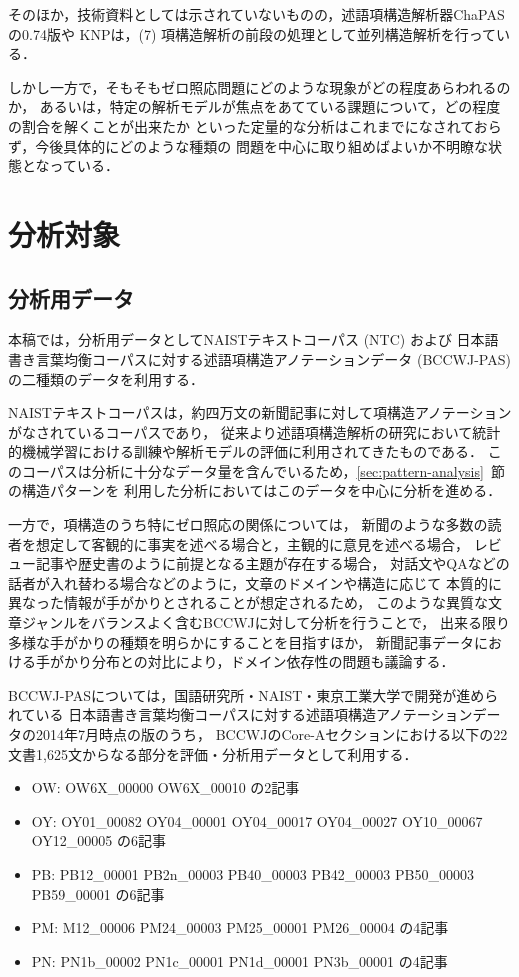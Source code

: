 \documentclass[japanese]{jnlp_1.4}
\begin{document}
そのほか，技術資料としては示されていないものの，述語項構造解析器ChaPASの0.74版\cite{chapas2013}や
KNP\cite{knp2013}は，(7) 項構造解析の前段の処理として並列構造解析を行っている．

しかし一方で，そもそもゼロ照応問題にどのような現象がどの程度あらわれるのか，
あるいは，特定の解析モデルが焦点をあてている課題について，どの程度の割合を解くことが出来たか
といった定量的な分析はこれまでになされておらず，今後具体的にどのような種類の
問題を中心に取り組めばよいか不明瞭な状態となっている．


\section{分析対象}

\subsection{分析用データ}

本稿では，分析用データとしてNAISTテキストコーパス (NTC) および
日本語書き言葉均衡コーパスに対する述語項構造アノテーションデータ (BCCWJ-PAS) の二種類のデータを利用する．

NAISTテキストコーパスは，約四万文の新聞記事に対して項構造アノテーションがなされているコーパスであり，
従来より述語項構造解析の研究において統計的機械学習における訓練や解析モデルの評価に利用されてきたものである．
このコーパスは分析に十分なデータ量を含んでいるため，\ref{sec:pattern-analysis}~節の構造パターンを
利用した分析においてはこのデータを中心に分析を進める．

一方で，項構造のうち特にゼロ照応の関係については，
新聞のような多数の読者を想定して客観的に事実を述べる場合と，主観的に意見を述べる場合，
レビュー記事や歴史書のように前提となる主題が存在する場合，
対話文やQAなどの話者が入れ替わる場合などのように，文章のドメインや構造に応じて
本質的に異なった情報が手がかりとされることが想定されるため，
このような異質な文章ジャンルをバランスよく含むBCCWJに対して分析を行うことで，
出来る限り多様な手がかりの種類を明らかにすることを目指すほか，
新聞記事データにおける手がかり分布との対比により，ドメイン依存性の問題も議論する．

BCCWJ-PASについては，国語研究所・NAIST・東京工業大学で開発が進められている
日本語書き言葉均衡コーパスに対する述語項構造アノテーションデータの2014年7月時点の版のうち，
BCCWJのCore-Aセクションにおける以下の22文書1,625文からなる部分を評価・分析用データとして利用する．

\begin{itemize}
\item OW: OW6X\_00000 OW6X\_00010 の2記事
\item OY: OY01\_00082 OY04\_00001 OY04\_00017 OY04\_00027 OY10\_00067 OY12\_00005 
 の6記事
\item PB: PB12\_00001 PB2n\_00003 PB40\_00003 PB42\_00003 PB50\_00003 PB59\_00001 
 の6記事
\item PM: M12\_00006 PM24\_00003 PM25\_00001 PM26\_00004
 の4記事
\item PN: PN1b\_00002 PN1c\_00001 PN1d\_00001 PN3b\_00001 の4記事
\end{itemize}
\end{document}
